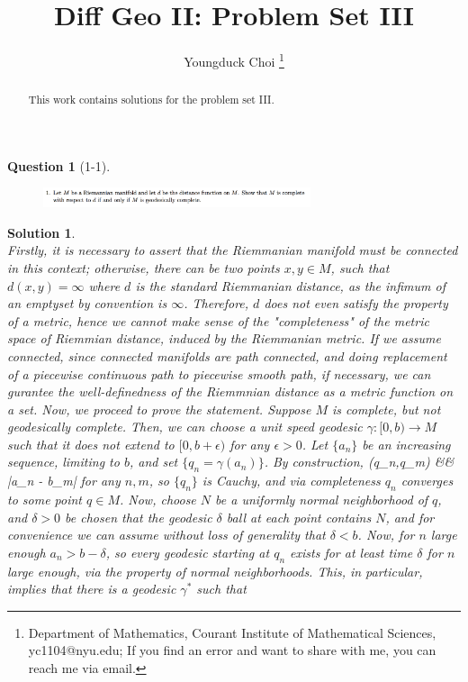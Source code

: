 \documentclass[11pt]{article}
\date{}
\title{\vspace{-0.7cm}
Diff Geo II: Problem Set III}
\author{
Youngduck Choi 
\thanks{Department of Mathematics, Courant Institute of Mathematical Sciences, 
yc1104@nyu.edu; If you find an error and want to share with me, 
you can reach me via email.
}}
\theoremstyle{plain}
\def\eQb#1\eQe{\begin{eqnarray*}#1\end{eqnarray*}}
\theoremstyle{quest}
\newtheorem*{question}{Question}
\newtheorem*{solution}{Solution}
\begin{document}
\maketitle

\begin{abstract}
This work contains solutions for the problem set III.
\end{abstract}


\begin{question}[1-1]
\hfill
\begin{figure}[h!]
  \centering
    \includegraphics[width=0.7\textwidth]{dg-s4-p1.png}
\end{figure}
\end{question}
\begin{solution} \hfill \\
Firstly, it is necessary to assert that the Riemmanian manifold must be connected
in this context;
otherwise, there can be two points $x,y \in M$, such that $d(x,y) = \infty$
where $d$ is the standard Riemmanian distance, 
as the infimum of an emptyset by convention
is $\infty$. Therefore, $d$ does not even satisfy
the property of a metric, hence we cannot make sense of the "completeness" of
the metric space of Riemmian distance, induced by the Riemmanian metric. If we
assume connected, since connected manifolds are path connected, and doing replacement
of a piecewise continuous path to piecewise smooth path, if necessary, we can 
gurantee the well-definedness of the Riemmnian distance as a metric function on a 
set. Now, we proceed to prove the statement. 
Suppose $M$ is complete, but not geodesically complete. Then, we can choose a unit
speed geodesic $\gamma:[0,b) \to M$ such that it does not extend to $[0,b+\epsilon)
$ for any $\epsilon > 0$. Let $\{a_n\}$ be an increasing sequence, limiting to $b$,
and set $\{ q_n = \gamma(a_n)\}$. By construction,
\eQb
d(q_n,q_m) &\leq& |a_n - b_m|
\eQe 
for any $n,m$, so $\{q_n\}$ is Cauchy, and via completeness $q_n$ converges to some
point $q \in M$. Now, choose $N$ be a uniformly normal neighborhood of $q$, and
$\delta >0$ be chosen that the geodesic $\delta$ ball at each point contains $N$,
and for convenience we can assume without loss of generality that $\delta < b$. 
Now, for $n$ large enough $a_n > b - \delta$, so every geodesic starting at 
$q_n$ exists for at least time $\delta$ for $n$ large enough,
via the property of normal neighborhoods. 
This, in particular, implies that there is a geodesic $\gamma^*$ such that 

\end{solution}
\end{document}
